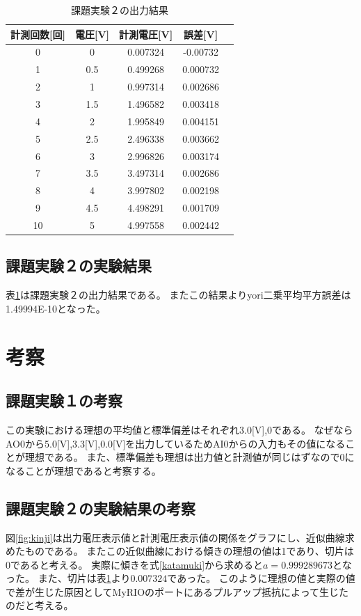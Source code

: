 \documentclass[11pt,dvipdfmx]{jarticle}
\begin{document}
				\begin{table}[b]
					\centering
					\caption{課題実験２の出力結果}
					\label{tab:task2}
					\begin{tabular}{|c|c|c|c|c|}
					\hline
					計測回数[回]&電圧[V]&計測電圧[V]&誤差[V]\\
					\hline
					0  & 0   & 0.007324 & -0.00732 \\
					1  & 0.5 & 0.499268 & 0.000732 \\
					2  & 1   & 0.997314 & 0.002686 \\
					3  & 1.5 & 1.496582 & 0.003418 \\
					4  & 2   & 1.995849 & 0.004151 \\
					5  & 2.5 & 2.496338 & 0.003662 \\
					6  & 3   & 2.996826 & 0.003174 \\
					7  & 3.5 & 3.497314 & 0.002686 \\
					8  & 4   & 3.997802 & 0.002198 \\
					9  & 4.5 & 4.498291 & 0.001709 \\
					10 & 5   & 4.997558 & 0.002442\\
					\hline
					\end{tabular}
					\end{table}

	\subsection{課題実験２の実験結果}
		表\ref{tab:task2}は課題実験２の出力結果である。
		またこの結果よりyori二乗平均平方誤差は1.49994E-10となった。
\section{考察}
	\subsection{課題実験１の考察}
	この実験における理想の平均値と標準偏差はそれぞれ3.0[V],0である。
	なぜならAO0から5.0[V],3.3[V],0.0[V]を出力しているためAI0からの入力もその値になることが理想である。
	また、標準偏差も理想は出力値と計測値が同じはずなので0になることが理想であると考察する。

	\subsection{課題実験２の実験結果の考察}
	図\ref{fig:kinji}は出力電圧表示値と計測電圧表示値の関係をグラフにし、近似曲線求めたものである。
	またこの近似曲線における傾きの理想の値は1であり、切片は0であると考える。
	実際に傾きを式\ref{katamuki}から求めると$a=0.999289673$となった。
	また、切片は表\ref{tab:task2}より$0.007324$であった。
	このように理想の値と実際の値で差が生じた原因としてMyRIOのポートにあるプルアップ抵抗によって生じたのだと考える。
\end{document}
